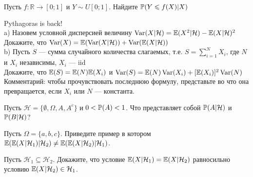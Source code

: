 \begin{solution}
\begin{solution}
\begin{solution}
\begin{solution}
\begin{solution}
\begin{solution}
\begin{solution}
\begin{solution}
\end{solution}

\begin{problem}
Пусть $f:\mathbb{R}\rightarrow [0;1]$ и $Y\sim
U[0;1]$. Найдите $\P(Y\le f(X)|X)$ 
\end{problem} 
\begin{solution} 

\end{solution}

\begin{problem}
 Pythagoras is back! \\
a) Назовем условной дисперсией величину
$\Var(X|\mathcal{H})=\E(X^{2}|\mathcal{H})-\E(X|\mathcal{H})^{2}$ \\
Докажите, что
$\Var(X)=\E(\Var(X|\mathcal{H}))+\Var(\E(X|\mathcal{H}))$ \\
b) Пусть $S$ --- сумма случайного количества слагаемых, т.е.
$S=\sum_{i=1}^{N}X_{i}$, где $N$ и $X_{i}$ независимы, $X_{i}$ --- iid \\
Докажите, что $\E(S)=\E(N)\E(X_{i})$ и
$\Var(S)=\E(N)\Var(X_{i})+[\E(X_{i})]^{2}\Var(N)$ \\
Комментарий: чтобы прочувствовать последнюю формулу, представьте
во что она превращается, если $X_{i}$ или $N$ --- константа. 
\end{problem} 
\begin{solution} 

\end{solution}

\begin{problem}
Пусть $\mathcal{H}=\{\emptyset,\Omega,A,A^{c}\}$ и $0<\P(A)<1$. Что
представляет собой $\P(A|\mathcal{H})$ и $\P(B|\mathcal{H})$? 
\end{problem} 
\begin{solution} 

\end{solution}

\begin{problem}
Пусть $\Omega=\{a,b,c\}$. Приведите пример в котором
$\E(\E(X|\mathcal{H}_{1})|\mathcal{H}_{2})\neq
\E(\E(X|\mathcal{H}_{2})|\mathcal{H}_{1})$. 
\end{problem} 
\begin{solution} 

\end{solution}

\begin{problem}
Пусть $\mathcal{H}_{1} \subseteq \mathcal{H}_{2}$. Докажите, что
условие $\E(X|\mathcal{H}_{1})=\E(X|\mathcal{H}_{2})$ равносильно
условию $\E(X|\mathcal{H}_{2})\in \mathcal{H}_{1}$. 
\end{problem} 
\begin{solution} 


\end{solution}
\end{solution}
\end{solution}
\end{solution}
\end{solution}
\end{solution}
\end{solution}
\end{solution}
